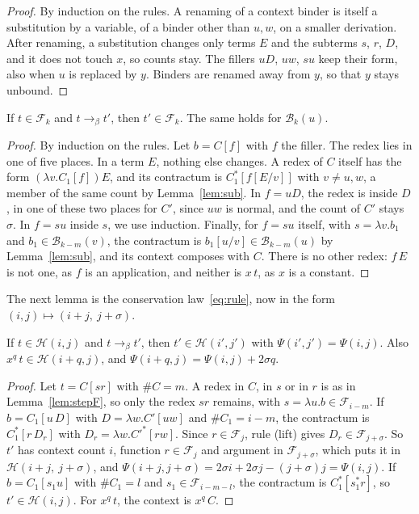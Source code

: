 \documentclass[a4paper,english]{lipics-v2021}
\newcommand{\bred}{\to_{\beta}}
\newcommand{\cnt}[1]{\##1}
\newcommand{\Fam}{\mathcal{F}}
\newcommand{\Bod}{\mathcal{B}}
\newcommand{\Hst}{\mathcal{H}}
\begin{document}
\begin{proof}
By induction on the rules. A renaming of a context binder is itself a substitution by a variable, of a binder other than $u,w$, on a smaller derivation. After renaming, a substitution changes only terms $E$ and the subterms $s$, $r$, $D$, and it does not touch $x$, so counts stay. The fillers $uD$, $uw$, $su$ keep their form, also when $u$ is replaced by $y$. Binders are renamed away from $y$, so that $y$ stays unbound.
\end{proof}

\begin{lemma}\label{lem:stepF}
If $t \in \Fam_k$ and $t \bred t'$, then $t' \in \Fam_k$. The same holds for $\Bod_k(u)$.
\end{lemma}

\begin{proof}
By induction on the rules. Let $b = C[f]$ with $f$ the filler. The redex lies in one of five places. In a term $E$, nothing else changes. A redex of $C$ itself has the form $(\lambda v.C_1[f])E$, and its contractum is $C_1^*[f[E/v]]$ with $v \neq u,w$, a member of the same count by Lemma~\ref{lem:sub}. In $f = uD$, the redex is inside $D$, in one of these two places for $C'$, since $uw$ is normal, and the count of $C'$ stays $\sigma$. In $f = su$ inside $s$, we use induction. Finally, for $f = su$ itself, with $s = \lambda v.b_1$ and $b_1 \in \Bod_{k-m}(v)$, the contractum is $b_1[u/v] \in \Bod_{k-m}(u)$ by Lemma~\ref{lem:sub}, and its context composes with $C$. There is no other redex: $f\,E$ is not one, as $f$ is an application, and neither is $x\,t$, as $x$ is a constant.
\end{proof}

The next lemma is the conservation law~\eqref{eq:rule}, now in the form $(i,j) \mapsto (i+j,\ j+\sigma)$.

\begin{lemma}\label{lem:stepH}
If $t \in \Hst(i,j)$ and $t \bred t'$, then $t' \in \Hst(i',j')$ with $\Psi(i',j') = \Psi(i,j)$. Also $x^q\,t \in \Hst(i+q,j)$, and $\Psi(i+q,j) = \Psi(i,j)+2\sigma q$.
\end{lemma}

\begin{proof}
Let $t = C[sr]$ with $\cnt{C} = m$. A redex in $C$, in $s$ or in $r$ is as in Lemma~\ref{lem:stepF}, so only the redex $sr$ remains, with $s = \lambda u.b \in \Fam_{i-m}$. If $b = C_1[u\,D]$ with $D = \lambda w.C'[uw]$ and $\cnt{C_1} = i-m$, the contractum is $C_1^*[r\,D_r]$ with $D_r = \lambda w.C'^*[rw]$. Since $r \in \Fam_j$, rule (lift) gives $D_r \in \Fam_{j+\sigma}$. So $t'$ has context count $i$, function $r \in \Fam_j$ and argument in $\Fam_{j+\sigma}$, which puts it in $\Hst(i+j,\ j+\sigma)$, and $\Psi(i+j,j+\sigma) = 2\sigma i + 2\sigma j - (j+\sigma)j = \Psi(i,j)$. If $b = C_1[s_1u]$ with $\cnt{C_1} = l$ and $s_1 \in \Fam_{i-m-l}$, the contractum is $C_1^*[s_1^*r]$, so $t' \in \Hst(i,j)$. For $x^q\,t$, the context is $x^q\,C$.
\end{proof}
\end{document}
